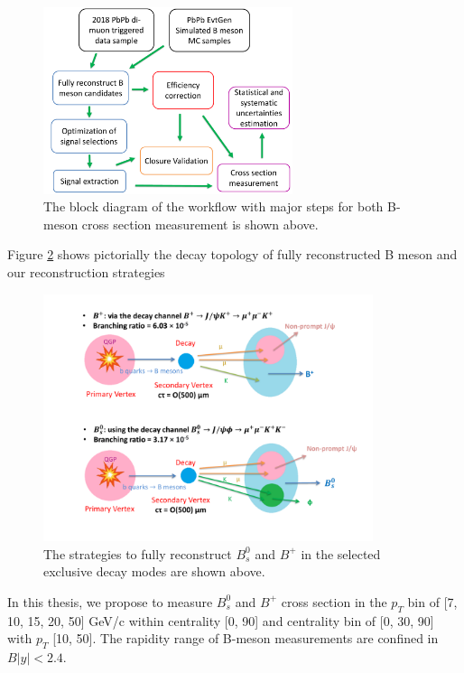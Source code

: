 \begin{figure}[hbtp]
\begin{center}
\includegraphics[width=0.65\textwidth]{Figures/Chapter5/BsBPWorkFlow.pdf}
\caption{The block diagram of the workflow with major steps for both B-meson cross section measurement is shown above.}
\label{BsBPWorkFlow}
\end{center}
\end{figure} 

Figure \ref{BsBPRECO} shows pictorially the decay topology of fully reconstructed B meson and our reconstruction strategies

\begin{figure}[hbtp]
\begin{center}
\includegraphics[width=0.86\textwidth]{Figures/Chapter5/BsBPRECO.pdf}
\caption{The strategies to fully reconstruct $B^0_s$ and $B^+$ in the selected exclusive decay modes are shown above.}
\label{BsBPRECO}
\end{center}
\end{figure} 

In this thesis, we propose to measure $B^0_s$ and $B^+$ cross section in the $p_T$ bin of [7, 10, 15, 20, 50] GeV/c within centrality [0, 90] and centrality bin of [0, 30, 90] with $p_T$ [10, 50]. The rapidity range of B-meson measurements are confined in $B |y| < 2.4$.

